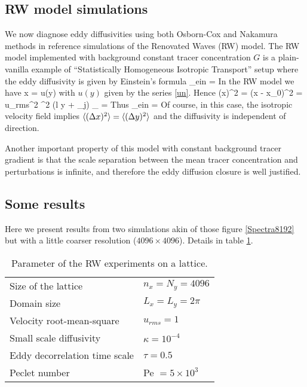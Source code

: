 \documentclass[11pt]{article}
\begin{document}
\subsection{RW model simulations}
We now diagnose eddy diffusivities using both Osborn-Cox and Nakamura methods in reference simulations of the Renovated Waves (RW) model.  The RW model implemented with background constant tracer concentration $G$ is a plain-vanilla example of ``Statistically Homogeneous Isotropic Transport'' setup where the eddy diffusivity is given by Einstein's formula
\beq
\label{einstein_eddy_diffusivity}
\kappa_{ein} = \per
\eeq 
In the RW model we have
\beq
\label{dxdt}
\dot x = u(y)\com
\eeq
with $u(y)$ given by the series \eqref{un}. Hence
\beq
\label{dx2}
\la (\Delta x)^2 \ra = \la (x - x_0)^2 \ra = u_{rms}^2 \tau^2 \la \cos (l y + \psi_j) \ra_{\psi} = \per 
\eeq
Thus
\beq
\label{einstein_eddy_diffusivity}
\kappa_{ein} = \per
\eeq 
Of course, in this case, the isotropic velocity field implies $\langle (\Delta x)^2\rangle = \langle (\Delta y)^2\rangle$ and the diffusivity is independent of direction.

Another important property of this model with constant background tracer gradient is that the scale separation between the mean tracer concentration and perturbations is infinite, and therefore the eddy diffusion closure is well justified.

\subsection{Some results}

Here we present results from two simulations akin of those figure \ref{Spectra8192} but with a little coarser resolution ($4096\times 4096$). Details in table \ref{RWExp}.
\begin{table}
\begin{center}
   \caption{\small Parameter of the RW experiments on a lattice.}
    \begin{tabular}{  l | l}
    \hline
    \hline
    	Size of the lattice & $n_x = N_y = 4096$\\
	Domain size & $L_x = L_y = 2 \pi$\\
	Velocity root-mean-square & $u_{rms} = 1$ \\
	Small scale diffusivity & $\kappa = 10^{-4} $\\
	Eddy decorrelation time scale & $\tau = 0.5$ \\
	Peclet number & \textsf{Pe} $= 5 \times10^3 $\\
    \hline
    \end{tabular}
    \end{center}
    \label{RWExp}
        \end{table}
\end{document}
